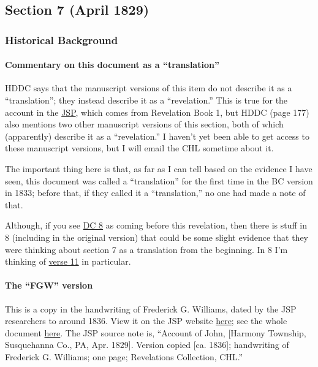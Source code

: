 \subsection{Section 7 (April 1829)}
	\label{DC7}
	
	\subsubsection{Historical Background}
		\label{DC7-HB}
		
		\paragraph{Commentary on this document as a ``translation''}
		
			HDDC says that the manuscript versions of this item do not describe it as a ``translation''; they instead describe it as a ``revelation.'' This is true for the account in the \hyperref[EMS-1828-1829-JS-APR-1829-C]{JSP}, which comes from Revelation Book 1, but HDDC (page 177) also mentions two other manuscript versions of this section, both of which (apparently) describe it as a ``revelation.'' I haven't yet been able to get access to these manuscript versions, but I will email the CHL sometime about it.
			
			The important thing here is that, as far as I can tell based on the evidence I have seen, this document was called a ``translation'' for the first time in the BC version in 1833; before that, if they called it a ``translation,'' no one had made a note of that.
			
			Although, if you see \hyperref[DC8]{DC 8} as coming before this revelation, then there is stuff in 8 (including in the original version) that could be some slight evidence that they were thinking about section 7 as a translation from the beginning. In 8 I'm thinking of \hyperref[DC8-11]{verse 11} in particular.
			
		\paragraph{The ``FGW'' version}
		
			This is a copy in the handwriting of Frederick G. Williams, dated by the JSP researchers to around 1836. View it on the JSP website \href{https://www.josephsmithpapers.org/paper-summary/account-of-john-april-1829-c-frederick-g-williams-copy-dc-7/1}{here}; see the whole document \href{https://drive.google.com/file/d/1BfD8CjmUlMydDjPZAj9Y5HwFHz2WgTe8/view?usp=sharing}{here}. The JSP source note is, ``Account of John, [Harmony Township, Susquehanna Co., PA, Apr. 1829]. Version copied [ca. 1836]; handwriting of Frederick G. Williams; one page; Revelations Collection, CHL.'' 
			
